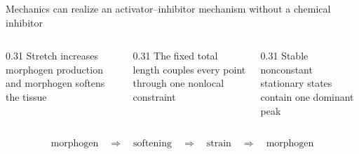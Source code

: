 \begin{frame}{Mechanics can realize an activator--inhibitor mechanism without a chemical inhibitor}

  \vspace{-0.08cm}

  \begin{columns}[T,onlytextwidth]
    \begin{column}{0.31\textwidth}
        {Stretch increases morphogen production and morphogen softens the tissue}
    \end{column}
    \begin{column}{0.31\textwidth}
        {The fixed total length couples every point through one nonlocal constraint}
    \end{column}
    \begin{column}{0.31\textwidth}
        {Stable nonconstant stationary states contain one dominant peak}
    \end{column}
  \end{columns}

  \vspace{0.42cm}

  {\color{HydraWhite}\bfseries\fontsize{12.2}{15.2}\selectfont
  \begin{align*}
    \text{morphogen}
    \quad\Longrightarrow\quad
    \text{softening}
    \quad\Longrightarrow\quad
    \text{strain}
    \quad\Longrightarrow\quad
    \text{morphogen}
  \end{align*}
  }

  \vspace{-0.14cm}


\end{frame}


\PerfectModel


